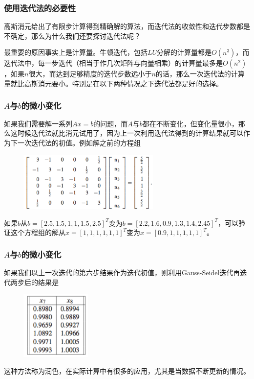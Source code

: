 \documentclass[10pt]{beamer}
\begin{document}
\begin{frame}
\frametitle{使用迭代法的必要性}
高斯消元给出了有限步计算得到精确解的算法，而迭代法的收敛性和迭代步数都是不确定，那么为什么我们还要探讨迭代法呢？

\vspace{0.2cm}

最重要的原因事实上是计算量。牛顿迭代，包括$LU$分解的计算量都是$O(n^3)$，而迭代法中，每一步迭代（相当于作几次矩阵与向量相乘）的计算量最多是$O(n^2)$，如果$n$很大，而达到足够精度的迭代步数远小于$n$的话，那么一次迭代法的计算量就比高斯消元要小。特别是在以下两种情况之下迭代法都是好的选择。
\end{frame}


\begin{frame}
\frametitle{$A$与$b$的微小变化}
如果我们需要解一系列$Ax = b$的问题，而$A$与$b$都在不断变化，但变化量很小，那么这时候迭代法就比消元试用了，因为上一次利用迭代法得到的计算结果就可以作为下一次迭代法的初值。例如解之前的方程组
\begin{figure}
\includegraphics[width=7cm]{figs/2_5_SOR-2} 
\end{figure}
如果$b$从$b = [2.5, 1.5, 1, 1, 1.5, 2.5]^T$变为$b = [2.2, 1.6, 0.9, 1.3, 1.4, 2.45]^T$，可以验证这个方程组的解从$x =[1,1,1,1,1,1]^T$变为$x = [0.9, 1, 1, 1, 1, 1]^T$。
\end{frame}


\begin{frame}
\frametitle{$A$与$b$的微小变化}
如果我们以上一次迭代的第六步结果作为迭代初值，则利用Gauss-Seidel迭代再迭代两步后的结果是
\begin{figure}
\includegraphics[width=3.5cm]{figs/2_5_SOR-4} 
\end{figure}
这种方法称为润色，在实际计算中有很多的应用，尤其是当数据不断更新的情况。
\end{frame}
\end{document}
